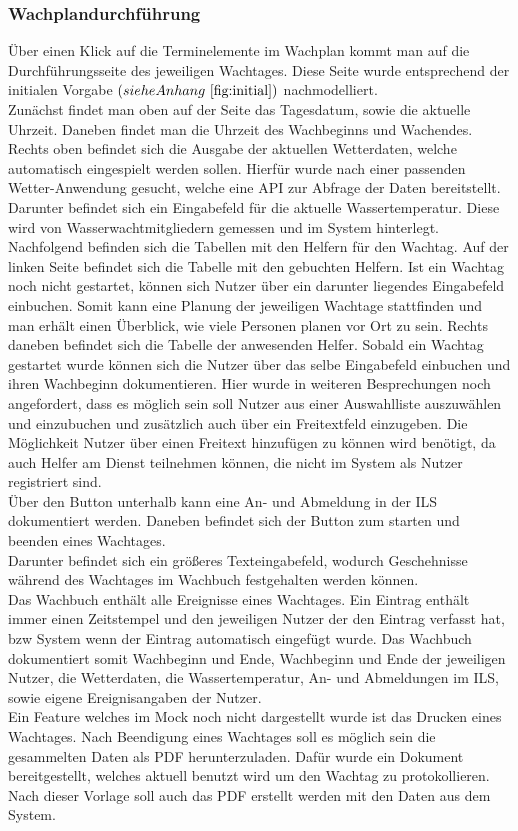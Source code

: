 \documentclass[fontsize=12pt,openright,oneside,paper=a4,BCOR=1cm]{scrbook}
\begin{document}
\subsubsection{Wachplandurchführung}
Über einen Klick auf die Terminelemente im Wachplan kommt man auf die Durchführungsseite des jeweiligen Wachtages. Diese Seite wurde entsprechend der initialen Vorgabe $(siehe Anhang ~\ref{fig:initial})$ nachmodelliert. \\
Zunächst findet man oben auf der Seite das Tagesdatum, sowie die aktuelle Uhrzeit. Daneben findet man die Uhrzeit des Wachbeginns und Wachendes. \\
Rechts oben befindet sich die Ausgabe der aktuellen Wetterdaten, welche automatisch eingespielt werden sollen. Hierfür wurde nach einer passenden Wetter-Anwendung gesucht, welche eine API zur Abfrage der Daten bereitstellt. Darunter befindet sich ein Eingabefeld für die aktuelle Wassertemperatur. Diese wird von Wasserwachtmitgliedern gemessen und im System hinterlegt. \\ 
Nachfolgend befinden sich die Tabellen mit den Helfern für den Wachtag. Auf der linken Seite befindet sich die Tabelle mit den gebuchten Helfern. Ist ein Wachtag noch nicht gestartet, können sich Nutzer über ein darunter liegendes Eingabefeld einbuchen. Somit kann eine Planung der jeweiligen Wachtage stattfinden und man erhält einen Überblick, wie viele Personen planen vor Ort zu sein. Rechts daneben befindet sich die Tabelle der anwesenden Helfer. Sobald ein Wachtag gestartet wurde können sich die Nutzer über das selbe Eingabefeld einbuchen und ihren Wachbeginn dokumentieren. Hier wurde in weiteren Besprechungen noch angefordert, dass es möglich sein soll Nutzer aus einer Auswahlliste auszuwählen und einzubuchen und zusätzlich auch über ein Freitextfeld einzugeben. Die Möglichkeit Nutzer über einen Freitext hinzufügen zu können wird benötigt, da auch Helfer am Dienst teilnehmen können, die nicht im System als Nutzer registriert sind. \\
Über den Button unterhalb kann eine An- und Abmeldung in der ILS dokumentiert werden. Daneben befindet sich der Button zum starten und beenden eines Wachtages.\\
Darunter befindet sich ein größeres Texteingabefeld, wodurch Geschehnisse während des Wachtages im Wachbuch festgehalten werden können.\\
Das Wachbuch enthält alle Ereignisse eines Wachtages. Ein Eintrag enthält immer einen Zeitstempel und den jeweiligen Nutzer der den Eintrag verfasst hat, bzw \glqq System\grqq{} wenn der Eintrag automatisch eingefügt wurde. Das Wachbuch dokumentiert somit Wachbeginn und Ende, Wachbeginn und Ende der jeweiligen Nutzer, die Wetterdaten, die Wassertemperatur, An- und Abmeldungen im ILS, sowie eigene Ereignisangaben der Nutzer.\\
Ein Feature welches im Mock noch nicht dargestellt wurde ist das Drucken eines Wachtages. Nach Beendigung eines Wachtages soll es möglich sein die gesammelten Daten als PDF herunterzuladen. Dafür wurde ein Dokument bereitgestellt, welches aktuell benutzt wird um den Wachtag zu protokollieren. Nach dieser Vorlage soll auch das PDF erstellt werden mit den Daten aus dem System.
\end{document}
